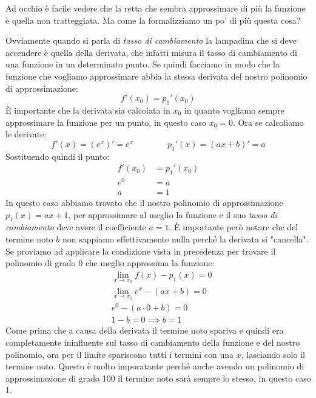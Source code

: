 Ad occhio è facile vedere che la retta che sembra approssimare di più la funzione è quella non tratteggiata. Ma come la formalizziamo un po' di più questa cosa?

Ovviamente quando si parla di \textit{tasso di cambiamento} la lampadina che si deve accendere è quella della derivata, che infatti misura il tasso di cambiamento di una funzione in un determinato punto. Se quindi facciamo in modo che la funzione che vogliamo approssimare abbia la stessa derivata del nostro polinomio di approssimazione:
\begin{equation*}
	f'(x_0) = p_1'(x_0)
\end{equation*}
È importante che la derivata sia calcolata in $x_0$ in quanto vogliamo sempre approssimare la funzione per un punto, in questo caso $x_0 = 0$. Ora se calcoliamo le derivate:
\begin{equation*}
	f'(x) = (e^x)' = e^x \qquad \qquad p_1'(x) = (ax + b)' = a
\end{equation*}
Sostituendo quindi il punto:
\begin{align*}
	f'(x_0) &= p_1'(x_0)\\
	e^{0} & = a\\
	a & = 1
\end{align*}
In questo caso abbiamo trovato che il nostro polinomio di approssimazione $p_1(x) = ax + 1$, per approssimare al meglio la funzione e il suo \textit{tasso di cambiamento} deve avere il coefficiente $a = 1$. È importante però notare che del termine noto $b$ non sappiamo effettivamente nulla perché la derivata si "cancella". Se proviamo ad applicare la condizione vista in precedenza per trovare il polinomio di grado 0 che meglio approssima la funzione:
\begin{align*}
	&\lim_{x \to x_0} f(x) - p_1(x) = 0\\
	&\lim_{x \to x_0} e^x - (ax + b) = 0\\
	&e^0 - (a \cdot 0 + b) = 0\\
	&1 - b = 0 \implies b = 1
\end{align*}
Come prima che a causa della derivata il termine noto spariva e quindi era completamente ininfluente sul tasso di cambiamento della funzione e del nostro polinomio, ora per il limite spariscono tutti i termini con una $x$, lasciando solo il termine noto. Questo è molto imporatante perché anche avendo un polinomio di approssimazione di grado 100 il termine noto sarà sempre lo stesso, in questo caso 1.

